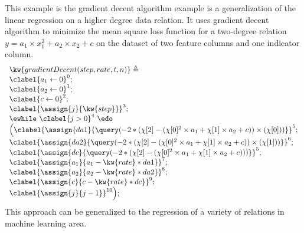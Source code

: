 %
    \begin{example}
        This example is the gradient decent algorithm example is a generalization of the linear regression on a higher degree data relation.
        It uses gradient decent algorithm to minimize 
        the mean square loss function
        for a two-degree relation
         $y = a_1 \times x_1^2 + a_2 \times x_2 + c$
        on the dataset of two feature columns and one indicator column.
     \[
     \begin{array}{l}
     \kw{gradientDecent(step, rate, t, n)} \triangleq \\
     \clabel{ a_1 \leftarrow 0}^{0} ; \\
     \clabel{ a_2 \leftarrow 0}^{1} ; \\
     \clabel{ c \leftarrow 0}^{2} ; \\
      \clabel{\assign{j}{\kw{step}} }^{3} ; \\
      \ewhile ~ \clabel{j > 0}^{4} ~ \edo ~ \\
      \Big(
          \clabel{\assign{da1}{\query(-2 * (\chi[2] - (\chi[0]^2 \times a_1 + \chi[1] \times a_2 + c)) \times (\chi[0]))} }^{5}  ; \\
          \clabel{\assign{da2}{\query(-2 * (\chi[2] - (\chi[0]^2 \times a_1 + \chi[1] \times a_2 + c)) \times (\chi[1]))} }^{6}  ; \\  \clabel{\assign{dc}{\query(-2 * (\chi[2] - (\chi[0]^2 \times a_1 + \chi[1] \times a_2 + c)))} }^{5}  ; \\
          \clabel{\assign{a_1}{a_1 - \kw{rate} * da1} }^{7}  ; \\
          \clabel{\assign{a_2}{a_2 - \kw{rate} * da2} }^{8}  ; \\
          \clabel{\assign{c}{c - \kw{rate} * dc} }^{9}  ; \\
       \clabel{\assign{j}{j-1}}^{10} 
      \Big);
  \end{array}
     \]
        This approach can be generalized to the regression of a variety of 
        relations in machine learning area.
     \end{example}
%


